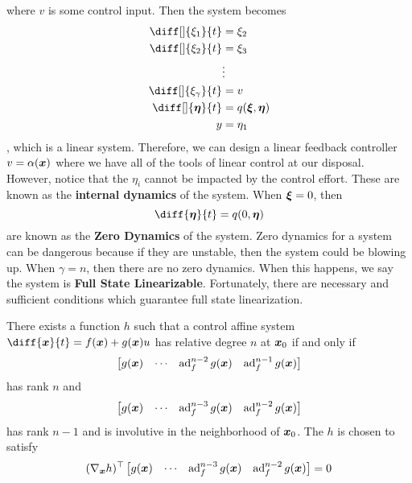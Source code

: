 where $v$ is some control input. Then the system becomes
\[
	\begin{aligned}
		\diff[]{\xi_1}{t} &= \xi_2\\
		\diff[]{\xi_2}{t} &= \xi_3\\
		&\vdots\\
		\diff[]{\xi_{\gamma}}{t} &= v\\
		\diff[]{\bs{\eta}}{t} &= q(\bs{\xi}, \bs{\eta})\\
		y &= \eta_1
	\end{aligned}
\],
which is a linear system. Therefore, we can design a linear feedback controller $v
= \alpha(\boldsymbol{x})$
where we have all of the tools of linear control at our disposal. However,
notice that the $\eta_i$ cannot be impacted by the control effort. These are
known as the \textbf{internal dynamics} of the system. When $\boldsymbol{\xi} = 0$,
then \[
	\diff{\bs{\eta}}{t} = q(0, \bs{\eta})
\]
are known as the \textbf{Zero Dynamics} of the system. Zero dynamics for a
system can be dangerous because if they are unstable, then the system could be
blowing up. When $\gamma = n$, then there are no zero dynamics. When this
happens, we say the system is \textbf{Full State Linearizable}. Fortunately,
there are necessary and sufficient conditions which guarantee full state
linearization.
\begin{theorem}
	There exists a function $h$ such that a control affine system
	$\diff{\bs{x}}{t} = f(\bs{x}) + g(\bs{x})u$ has relative degree $n$ at
	$\boldsymbol{x}_0$ if and only if \[
		\begin{bmatrix}
			g(\boldsymbol{x}) & \cdots & \operatorname*{ad}_f^{n-2}g(\boldsymbol{x}) & \operatorname*{ad}_f^{n-1}g(\boldsymbol{x})
		\end{bmatrix}
	\]
	has rank $n$ and \[
		\begin{bmatrix}
			g(\boldsymbol{x}) & \cdots & \operatorname*{ad}_f^{n-3}g(\boldsymbol{x}) & \operatorname*{ad}_f^{n-2}g(\boldsymbol{x})
		\end{bmatrix}
	\]
	has rank $n-1$ and is involutive in the neighborhood of $\boldsymbol{x}_0$. The $h$ is
	chosen to satisfy \[
		(\nabla_{\boldsymbol{x}}h)^\top \begin{bmatrix}
			g(\boldsymbol{x}) & \cdots & \operatorname*{ad}_f^{n-3}g(\boldsymbol{x}) & \operatorname*{ad}_f^{n-2}g(\boldsymbol{x})
		\end{bmatrix} = 0
	\]
	\label{thm:full-state-linearization}
\end{theorem}
